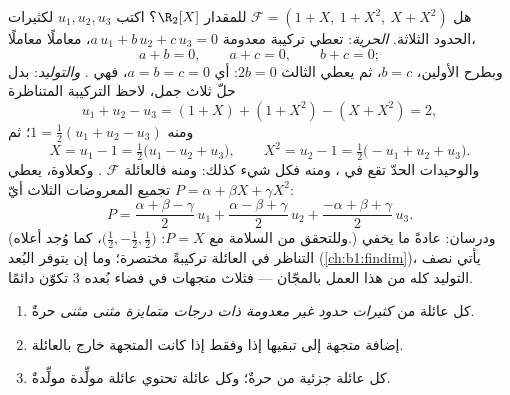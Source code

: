 \begin{example}
\label{ex:b1:vspaces:testbasis}
هل $\mathcal{F} = (1 + X,\ 1 + X^2,\ X + X^2)$  للمقدار
$\R_2[X]$؟ اكتب $u_1, u_2, u_3$ لكثيرات الحدود الثلاثة.
\emph{الحرية}: تعطي تركيبة معدومة $a\,u_1 + b\,u_2 + c\,u_3 =
0$، معاملًا معاملًا،
\[
a + b = 0, \qquad a + c = 0, \qquad b + c = 0 ;
\]
وبطرح الأولين، $b = c$، ثم يعطي الثالث $2b =
0$: أي $a = b = c = 0$، فهي . \emph{والتوليد}: بدل حلّ
ثلاث جمل، لاحظ التركيبة المتناظرة
\[
u_1 + u_2 - u_3 = (1 + X) + (1 + X^2) - (X + X^2) = 2 ,
\]
ومنه $1 = \frac12(u_1 + u_2 - u_3)$؛ ثم
\[
X = u_1 - 1 = \tfrac12\bigl(u_1 - u_2 + u_3\bigr),
\qquad
X^2 = u_2 - 1 = \tfrac12\bigl(-u_1 + u_2 + u_3\bigr).
\]
والوحيدات الحدّ تقع في ، ومنه فكل شيء كذلك: ومنه فالعائلة $\mathcal{F}$
. وكعلاوة، يعطي تجميع المعروضات الثلاث
 أيّ $P = \alpha + \beta X + \gamma X^2$:
\[
P = \frac{\alpha + \beta - \gamma}{2}\,u_1
+ \frac{\alpha - \beta + \gamma}{2}\,u_2
+ \frac{-\alpha + \beta + \gamma}{2}\,u_3 .
\]
(وللتحقق من السلامة مع $P = X$:  $\bigl(\frac12,
-\frac12, \frac12\bigr)$، كما وُجد أعلاه.) ودرسان: عادةً ما يخفي التناظر
في العائلة تركيبةً مختصرة؛ وما إن يتوفر البُعد
(\cref{ch:b1:findim})، يأتي نصف التوليد كله
من هذا العمل بالمجّان --- فثلاث متجهات  في فضاء
بُعده $3$ تكوّن  دائمًا.
\end{example}

\begin{proposition}\label{prop:b1:vspaces:freecriteria}
\begin{enumerate}
  \item كل عائلة من \emph{كثيرات حدود غير معدومة ذات درجات متمايزة
        مثنى مثنى} حرةٌ.
  \item إضافة متجهة إلى  تبقيها  إذا وفقط
        إذا كانت المتجهة خارج  بالعائلة.
  \item كل عائلة جزئية من  حرةٌ؛ وكل عائلة
        تحتوي عائلة مولِّدة مولِّدةٌ.
\end{enumerate}
\end{proposition}

